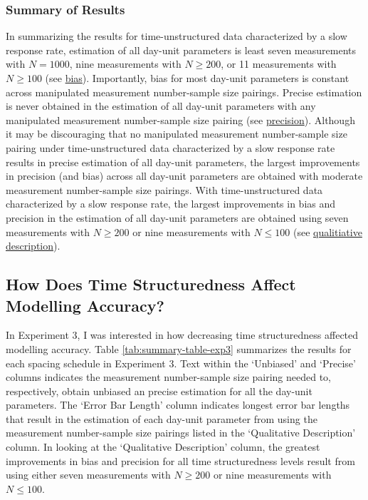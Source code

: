 \documentclass[
12pt, %
twoside,
english]{guelphthesis}
\begin{document}
\hypertarget{summary-of-results-10}{%
\subsubsection{Summary of Results}\label{summary-of-results-10}}

In summarizing the results for time-unstructured data characterized by a slow response rate, estimation of all day-unit parameters is least seven measurements with \(N = 1000\), nine measurements with \(N \ge 200\), or 11 measurements with \(N \ge 100\) (see \protect\hyperlink{bias-slow-exp3}{bias}). Importantly, bias for most day-unit parameters is constant across manipulated measurement number-sample size pairings. Precise estimation is never obtained in the estimation of all day-unit parameters with any manipulated measurement number-sample size pairing (see \protect\hyperlink{precision-slow-exp3}{precision}). Although it may be discouraging that no manipulated measurement number-sample size pairing under time-unstructured data characterized by a slow response rate results in precise estimation of all day-unit parameters, the largest improvements in precision (and bias) across all day-unit parameters are obtained with moderate measurement number-sample size pairings. With time-unstructured data characterized by a slow response rate, the largest improvements in bias and precision in the estimation of all day-unit parameters are obtained using seven measurements with \(N \ge 200\) or nine measurements with \(N \le 100\) (see \protect\hyperlink{qualitative-slow-exp3}{qualitiative description}).

\hypertarget{how-does-time-structuredness-affect-modelling-accuracy}{%
\subsection{How Does Time Structuredness Affect Modelling Accuracy?}\label{how-does-time-structuredness-affect-modelling-accuracy}}

In Experiment 3, I was interested in how decreasing time structuredness affected modelling accuracy. Table \ref{tab:summary-table-exp3} summarizes the results for each spacing schedule in Experiment 3. Text within the `Unbiased' and `Precise' columns indicates the measurement number-sample size pairing needed to, respectively, obtain unbiased an precise estimation for all the day-unit parameters. The `Error Bar Length' column indicates longest error bar lengths that result in the estimation of each day-unit parameter from using the measurement number-sample size pairings listed in the `Qualitative Description' column. In looking at the `Qualitative Description' column, the greatest improvements in bias and precision for all time structuredness levels result from using either seven measurements with \(N \ge 200\) or nine measurements with \(N \le 100\).
\end{document}
